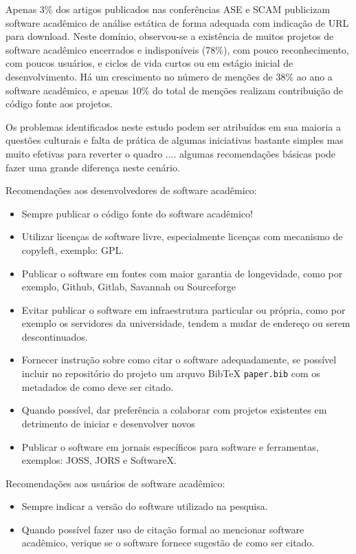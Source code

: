 \label{conclusoes}

Apenas 3\% dos artigos publicados nas conferências ASE e SCAM publicizam
software acadêmico de análise estática de forma adequada com indicação de URL
para download.
Neste domínio, observou-se a existência de muitos projetos de
software acadêmico encerrados e indisponíveis (78\%), com pouco reconhecimento,
com poucos usuários, e ciclos de vida curtos ou em estágio inicial de
desenvolvimento.
Há um crescimento no número de menções de 38\% ao ano a software acadêmico, e
apenas 10\% do total de menções realizam contribuição de código fonte aos
projetos.

Os problemas identificados neste estudo podem ser atribuídos em sua maioria a
questões culturais e falta de prática de algumas iniciativas bastante simples
mas muito efetivas para reverter o quadro .... algumas recomendações básicas
pode fazer uma grande diferença neste cenário.

Recomendações aos desenvolvedores de software acadêmico:

\begin{itemize}
  \item Sempre publicar o código fonte do software acadêmico!
  \item Utilizar licenças de software livre, especialmente licenças com mecanismo de copyleft, exemplo: GPL.
  \item Publicar o software em fontes com maior garantia de longevidade, como por exemplo, Github, Gitlab, Savannah ou Sourceforge
  \item Evitar publicar o software em infraestrutura particular ou própria, como por exemplo os servidores da universidade, tendem a mudar de endereço ou serem descontinuados.
  \item Fornecer instrução sobre como citar o software adequadamente, se possível incluir no repositório do projeto um arquvo BibTeX \texttt{paper.bib} com os metadados de como deve ser citado.
  \item Quando possível, dar preferência a colaborar com projetos existentes em detrimento de iniciar e desenvolver novos
  \item Publicar o software em jornais específicos para software e ferramentas, exemplos: JOSS, JORS e SoftwareX.
\end{itemize}

Recomendações aos usuários de software acadêmico:

\begin{itemize}
  \item Sempre indicar a versão do software utilizado na pesquisa.
  \item Quando possível fazer uso de citação formal ao mencionar software acadêmico, verique se o software fornece sugestão de como ser citado.
\end{itemize}

